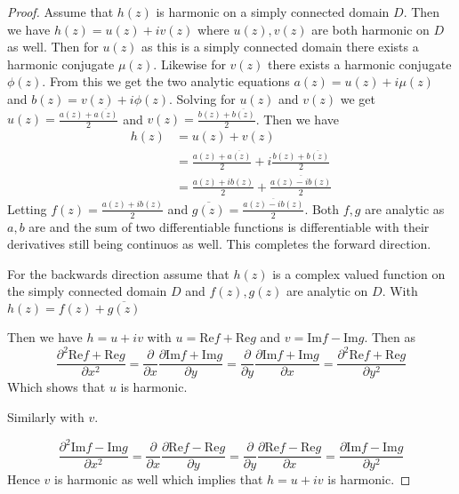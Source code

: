 \documentclass[letter,12pt,reqno]{article}
\begin{document}
\begin{proof}

    Assume that $h(z)$ is harmonic on a simply connected domain $D$. Then we have $h(z)=u(z)+iv(z)$ where $u(z),v(z)$ are both harmonic on $D$ as well. Then for $u(z)$ as this is a simply connected domain there exists a harmonic conjugate $\mu (z)$. Likewise for $v(z)$ there exists a harmonic conjugate $\phi(z)$. From this we get the two analytic equations $a(z)=u(z)+i\mu(z)$ and $b(z)=v(z)+i\phi(z)$. Solving for $u(z)$ and $v(z)$ we get $u(z)=\frac{a(z)+\overline{a(z)}}{2}$ and $v(z)=\frac{b(z)+\overline{b(z)}}{2}$. Then we have \begin{align*}
        h(z)&=u(z)+v(z)\\&=\frac{a(z)+\overline{a(z)}}{2}+i\frac{b(z)+\overline{b(z)}}{2}\\
        &=\frac{a(z)+ib(z)}{2}+\frac{\overline{ a(z)-ib (z)}}{2}
    \end{align*}
    Letting $f(z)=\frac{a(z)+ib(z)}{2}$ and $\overline{g(z)}=\frac{\overline{ a(z)-ib (z)}}{2}$. Both $f,g$ are analytic as $a,b$ are and the sum of two differentiable functions is differentiable with their derivatives still being continuos as well. This completes the forward direction.

    For the backwards direction assume that $h(z)$ is a complex valued function on the simply connected domain $D$ and $f(z),g(z)$ are analytic on $D$. With $h(z)=f(z)+\overline{g(z)}$

    Then we have $h=u+ iv$ with $u=\text{Re} f+\text{Re}g$ and $v=\text{Im}f-\text{Im}g$. Then as \[\frac{\partial^2  \text{Re} f+\text{Re}g}{\partial x^2}=\frac{\partial }{\partial x}\frac{\partial \text{Im}f +\text{Im}g}{\partial y}=\frac{\partial }{\partial y}\frac{\partial \text{Im}f +\text{Im}g}{\partial x}=\frac{\partial ^2 \text{Re}f+\text{Re}g}{\partial y^2}\]
    Which shows that $u$ is harmonic.

    Similarly with $v$.
    
    \[
        \frac{\partial ^2 \text{Im}f - \text{Im}g}{\partial x^2}=\frac{\partial}{\partial x} \frac{\partial \text{Re}f-\text{Re}g}{\partial y}=\frac{\partial}{\partial y} \frac{\partial \text{Re}f-\text{Re}g}{\partial x}=\frac{\partial \text{Im}f -\text{Im} g}{\partial y^2}
    \]
    Hence $v$ is harmonic as well which implies that $h=u+iv$  is harmonic. 


\end{proof}
\end{document}
